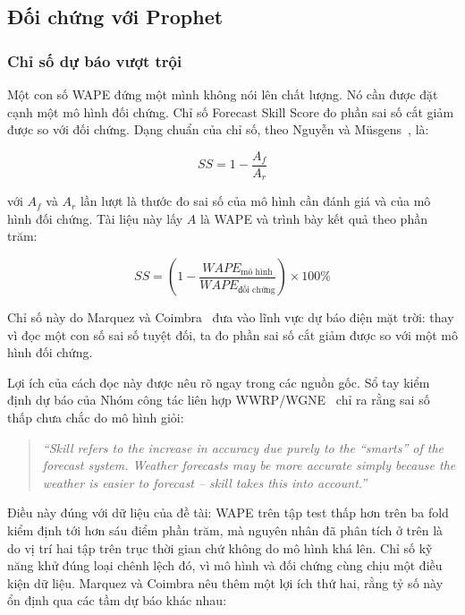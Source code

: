 \documentclass[12pt, a4paper]{report}
\begin{document}
\FloatBarrier
\subsection{Đối chứng với Prophet}

\subsubsection{Chỉ số dự báo vượt trội}

Một con số WAPE đứng một mình không nói lên chất lượng. Nó cần được đặt cạnh một mô hình đối
chứng. Chỉ số Forecast Skill Score đo phần sai số cắt giảm được so với đối chứng. Dạng chuẩn của
chỉ số, theo Nguyễn và Müsgens~\cite{nguyen2026meta}, là:

\begin{equation}
\label{eq:ss_tong_quat}
SS = 1 - \frac{A_f}{A_r}
\end{equation}

với $A_f$ và $A_r$ lần lượt là thước đo sai số của mô hình cần đánh giá và của mô hình đối
chứng. Tài liệu này lấy $A$ là WAPE và trình bày kết quả theo phần trăm:

\begin{equation}
\label{eq:ss_wape}
SS = \left(1 - \frac{WAPE_{\text{mô hình}}}{WAPE_{\text{đối chứng}}}\right) \times 100\%
\end{equation}

Chỉ số này do Marquez và Coimbra~\cite{marquez2013skill} đưa vào lĩnh vực dự báo điện mặt trời:
thay vì đọc một con số sai số tuyệt đối, ta đo phần sai số cắt giảm được so với một mô hình đối
chứng.

Lợi ích của cách đọc này được nêu rõ ngay trong các nguồn gốc. Sổ tay kiểm định dự báo của Nhóm công
tác liên hợp WWRP/WGNE~\cite{wwrp2009verif} chỉ ra rằng sai số thấp chưa chắc do mô hình giỏi:

\begin{quote}\small
\textit{``Skill refers to the increase in accuracy due purely to the ``smarts'' of the forecast
system. Weather forecasts may be more accurate simply because the weather is easier to forecast
-- skill takes this into account.''}
\end{quote}

Điều này đúng với dữ liệu của đề tài: WAPE trên tập test thấp hơn trên ba fold kiểm định tới hơn
sáu điểm phần trăm, mà nguyên nhân đã phân tích ở trên là do vị trí hai tập trên trục thời gian
chứ không do mô hình khá lên. Chỉ số kỹ năng khử đúng loại chênh lệch đó, vì mô hình và đối
chứng cùng chịu một điều kiện dữ liệu. Marquez và Coimbra nêu thêm một lợi ích thứ hai, rằng tỷ
số này ổn định qua các tầm dự báo khác nhau:
\end{document}
